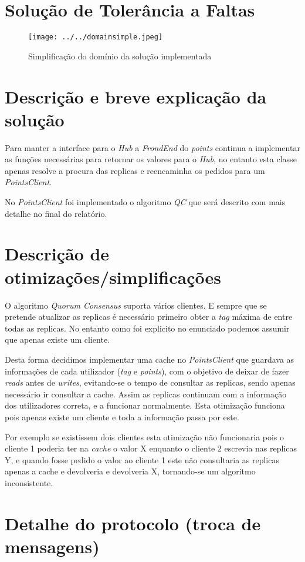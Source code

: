 \documentclass[a4paper]{article}
\begin{document}
\section{Solução de Tolerância a Faltas}
\begin{figure}[h!]
	\texttt{[image: ../../domainsimple.jpeg]}
	\caption{Simplificação do domínio da solução implementada}
	\label{fig:domain}
\end{figure}
\section{Descrição e breve explicação da solução}

Para manter a interface para o \textit{Hub} a	\textit{FrondEnd} do \textit{points} continua a implementar as funções necessárias para retornar os valores para o \textit{Hub}, no entanto esta classe apenas resolve a procura das replicas e reencaminha os pedidos para um \textit{PointsClient}.

No \textit{PointsClient} foi implementado o algoritmo \textit{QC} que será descrito com mais detalhe no final do relatório.
\section{Descrição de otimizações/simplificações}
   O algoritmo \textit{Quorum Consensus} suporta vários clientes.  E sempre que se pretende atualizar as replicas é necessário primeiro obter a \textit{tag} máxima de entre todas as replicas. No entanto como foi explicito no enunciado podemos assumir que apenas existe um cliente.
   
   Desta forma decidimos implementar uma cache no \textit{PointsClient} que guardava as informações de cada utilizador (\textit{tag} e \textit{points}), com o objetivo de deixar de fazer \textit{reads} antes de \textit{writes}, evitando-se o tempo de consultar as replicas, sendo apenas necessário ir consultar a cache. Assim as replicas continuam com a informação dos utilizadores correta, e a funcionar normalmente. Esta otimização funciona pois apenas existe um cliente e toda a informação passa por este.
   
   Por exemplo se existissem dois clientes esta otimização não funcionaria pois o cliente 1 poderia ter na \textit{cache} o valor X enquanto o cliente 2 escrevia nas replicas Y,   e quando fosse pedido o valor ao cliente 1 este não consultaria as replicas apenas a cache e devolveria e devolveria X, tornando-se um algoritmo inconsistente.
\section{Detalhe do protocolo (troca de mensagens)}
\end{document}

